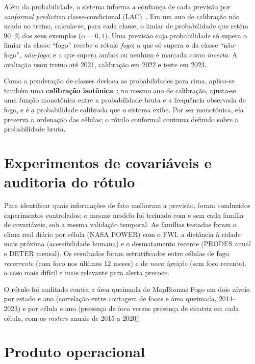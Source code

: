 \documentclass[tcc2]{uftex}
\begin{document}
Além da probabilidade, o sistema informa a confiança de cada previsão por \emph{conformal prediction} classe-condicional (LAC)~\cite{sadinle2019lac,mortier2024conformal}. Em um ano de calibração não usado no treino, calcula-se, para cada classe, o limiar de probabilidade que retém \SI{90}{\percent} dos seus exemplos (\(\alpha = 0{,}1\)). Uma previsão cuja probabilidade só supera o limiar da classe ``fogo'' recebe o rótulo \emph{fogo}; a que só supera o da classe ``não-fogo'', \emph{não-fogo}; e a que supera ambos ou nenhum é marcada como \emph{incerta}. A avaliação usou treino até 2021, calibração em 2022 e teste em 2023.

Como a ponderação de classes desloca as probabilidades para cima, aplica-se também uma \textbf{calibração isotônica}~\cite{zadrozny2002transforming}: no mesmo ano de calibração, ajusta-se uma função monotônica entre a probabilidade bruta e a frequência observada de fogo, e é a probabilidade calibrada que o sistema exibe. Por ser monotônica, ela preserva a ordenação das células; o rótulo conformal continua definido sobre a probabilidade bruta.

\section{Experimentos de covariáveis e auditoria do rótulo}
\label{sec:metod_covariaveis}

Para identificar quais informações de fato melhoram a previsão, foram conduzidos experimentos controlados: o mesmo modelo foi treinado com e sem cada família de covariáveis, sob a mesma validação temporal. As famílias testadas foram o clima real diário por célula (NASA POWER) com o FWI, a distância à cidade mais próxima (acessibilidade humana) e o desmatamento recente (PRODES anual e DETER mensal). Os resultados foram estratificados entre células de fogo \emph{recorrente} (com foco nos últimos 12 meses) e de \emph{nova ignição} (sem foco recente), o caso mais difícil e mais relevante para alerta precoce.

O rótulo foi auditado contra a área queimada do MapBiomas Fogo em dois níveis: por estado e ano (correlação entre contagem de focos e área queimada, 2014--2023) e por célula e ano (presença de foco versus presença de cicatriz em cada célula, com os \emph{rasters} anuais de 2015 a 2020).

\section{Produto operacional}
\label{sec:metod_produto}
\end{document}
